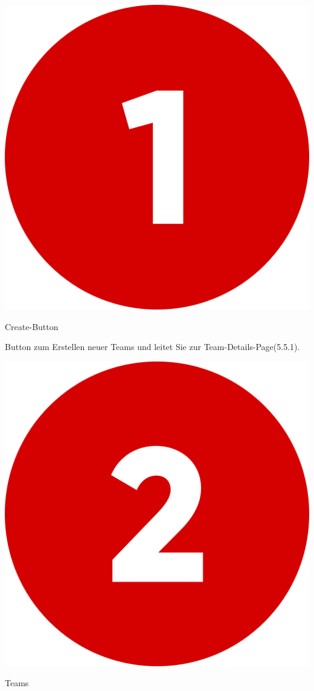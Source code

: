 \includegraphics[scale=0.05]{pics/user-guide/numbers/number-1.png} \begin{LARGE} Create-Button \end{LARGE}

Button zum Erstellen neuer Teams und leitet Sie zur Team-Details-Page(5.5.1).

\bigskip
\includegraphics[scale=0.05]{pics/user-guide/numbers/number-2.png} \begin{LARGE} Teams \end{LARGE}

